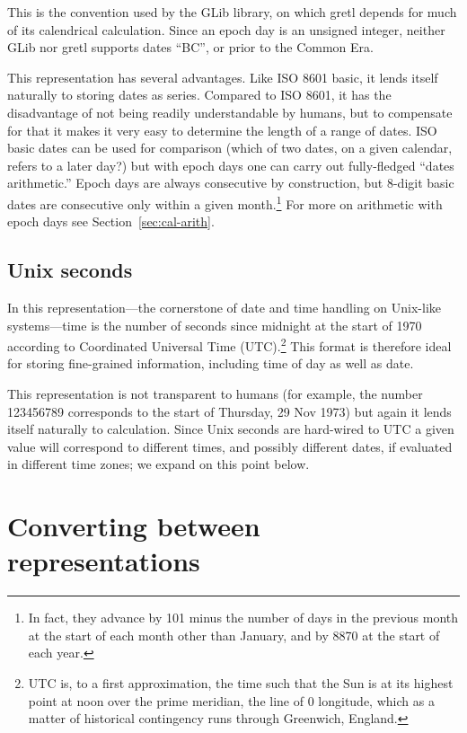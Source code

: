 This is the convention used by the \textsf{GLib} library, on which
gretl depends for much of its calendrical calculation. Since an epoch
day is an unsigned integer, neither \textsf{GLib} nor gretl supports
dates ``BC'', or prior to the Common Era.

This representation has several advantages. Like ISO 8601 basic, it
lends itself naturally to storing dates as series. Compared to ISO
8601, it has the disadvantage of not being readily understandable by
humans, but to compensate for that it makes it very easy to determine
the length of a range of dates.  ISO basic dates can be used for
comparison (which of two dates, on a given calendar, refers to a later
day?) but with epoch days one can carry out fully-fledged ``dates
arithmetic.''  Epoch days are always consecutive by construction, but
8-digit basic dates are consecutive only within a given
month.\footnote{In fact, they advance by 101 minus the number of days
  in the previous month at the start of each month other than
  January, and by 8870 at the start of each year.} For more on
arithmetic with epoch days see Section~\ref{sec:cal-arith}.

\subsection{Unix seconds}
\label{sec:cal-seconds}

In this representation---the cornerstone of date and time handling on
Unix-like systems---time is the number of seconds since midnight at
the start of 1970 according to Coordinated Universal Time
(UTC).\footnote{UTC is, to a first approximation, the time such that
  the Sun is at its highest point at noon over the prime meridian, the
  line of 0\textdegree{} longitude, which as a matter of historical
  contingency runs through Greenwich, England.}  This format is
therefore ideal for storing fine-grained information, including time
of day as well as date.

This representation is not transparent to humans (for example, the
number 123456789 corresponds to the start of Thursday, 29 Nov 1973)
but again it lends itself naturally to calculation. Since Unix seconds
are hard-wired to UTC a given value will correspond to different
times, and possibly different dates, if evaluated in different time
zones; we expand on this point below.

\section{Converting between representations}
\label{sec:cal-conversions}

